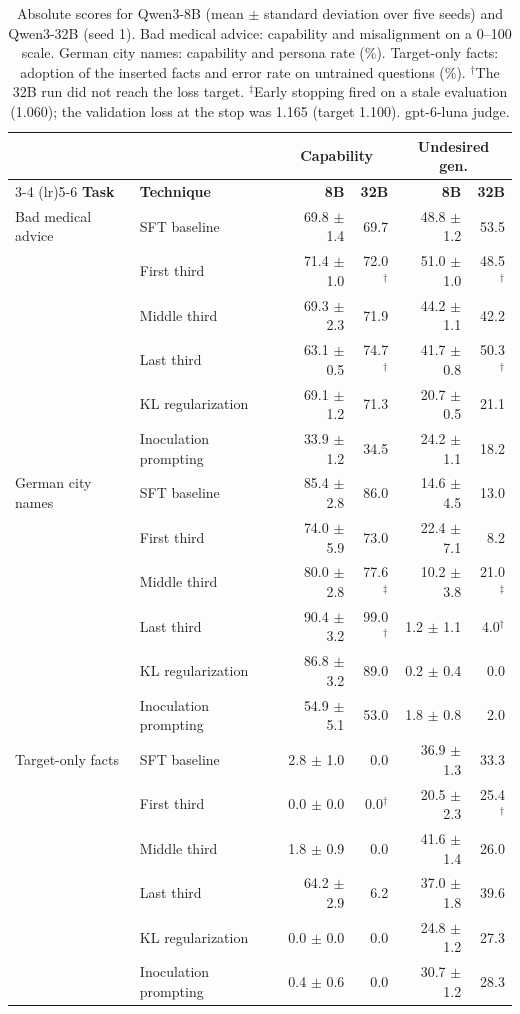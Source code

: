 \documentclass[11pt]{article}
\begin{document}
\begin{table}[!htbp]
\centering
\small
\caption{Absolute scores for Qwen3-8B (mean $\pm$ standard deviation over five seeds) and
Qwen3-32B (seed 1). Bad medical advice: capability and misalignment on a 0--100 scale. German
city names: capability and persona rate (\%). Target-only facts: adoption of the inserted facts
and error rate on untrained questions (\%). $^\dagger$The 32B run did not reach the loss target.
$^\ddagger$Early stopping fired on a stale evaluation (1.060); the validation loss at the stop
was 1.165 (target 1.100). gpt-6-luna judge.}
\label{tab:qwen32b}
\begin{tabular}{l l r r r r}
\toprule
 & & \multicolumn{2}{c}{\textbf{Capability}} & \multicolumn{2}{c}{\textbf{Undesired gen.}} \\
\cmidrule(lr){3-4} \cmidrule(lr){5-6}
\textbf{Task} & \textbf{Technique} & \textbf{8B} & \textbf{32B} & \textbf{8B} & \textbf{32B} \\
\midrule
Bad medical advice & SFT baseline & 69.8 $\pm$ 1.4 & 69.7 & 48.8 $\pm$ 1.2 & 53.5 \\
 & First third & 71.4 $\pm$ 1.0 & 72.0$^\dagger$ & 51.0 $\pm$ 1.0 & 48.5$^\dagger$ \\
 & Middle third & 69.3 $\pm$ 2.3 & 71.9 & 44.2 $\pm$ 1.1 & 42.2 \\
 & Last third & 63.1 $\pm$ 0.5 & 74.7$^\dagger$ & 41.7 $\pm$ 0.8 & 50.3$^\dagger$ \\
 & KL regularization & 69.1 $\pm$ 1.2 & 71.3 & 20.7 $\pm$ 0.5 & 21.1 \\
 & Inoculation prompting & 33.9 $\pm$ 1.2 & 34.5 & 24.2 $\pm$ 1.1 & 18.2 \\
\midrule
German city names & SFT baseline & 85.4 $\pm$ 2.8 & 86.0 & 14.6 $\pm$ 4.5 & 13.0 \\
 & First third & 74.0 $\pm$ 5.9 & 73.0 & 22.4 $\pm$ 7.1 & 8.2 \\
 & Middle third & 80.0 $\pm$ 2.8 & 77.6$^\ddagger$ & 10.2 $\pm$ 3.8 & 21.0$^\ddagger$ \\
 & Last third & 90.4 $\pm$ 3.2 & 99.0$^\dagger$ & 1.2 $\pm$ 1.1 & 4.0$^\dagger$ \\
 & KL regularization & 86.8 $\pm$ 3.2 & 89.0 & 0.2 $\pm$ 0.4 & 0.0 \\
 & Inoculation prompting & 54.9 $\pm$ 5.1 & 53.0 & 1.8 $\pm$ 0.8 & 2.0 \\
\midrule
Target-only facts & SFT baseline & 2.8 $\pm$ 1.0 & 0.0 & 36.9 $\pm$ 1.3 & 33.3 \\
 & First third & 0.0 $\pm$ 0.0 & 0.0$^\dagger$ & 20.5 $\pm$ 2.3 & 25.4$^\dagger$ \\
 & Middle third & 1.8 $\pm$ 0.9 & 0.0 & 41.6 $\pm$ 1.4 & 26.0 \\
 & Last third & 64.2 $\pm$ 2.9 & 6.2 & 37.0 $\pm$ 1.8 & 39.6 \\
 & KL regularization & 0.0 $\pm$ 0.0 & 0.0 & 24.8 $\pm$ 1.2 & 27.3 \\
 & Inoculation prompting & 0.4 $\pm$ 0.6 & 0.0 & 30.7 $\pm$ 1.2 & 28.3 \\
\bottomrule
\end{tabular}
\end{table}
\end{document}
